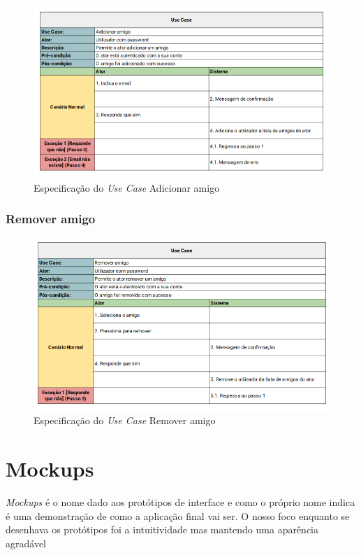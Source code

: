 \documentclass[a4paper]{report}
\begin{document}
\begin{figure}[H]
	\centering 
    \includegraphics[width=\textwidth]{images/Adicionar_Amigo.png}  
    \caption{Especificação do \emph{Use Case} Adicionar amigo}
\end{figure}


\subsection{Remover amigo}

\begin{figure}[H]
	\centering 
    \includegraphics[width=\textwidth]{images/Remover_Amigo.png}  
    \caption{Especificação do \emph{Use Case} Remover amigo}
\end{figure}


\chapter{Mockups}

\textit{Mockups} é o nome dado aos protótipos de interface e como o próprio nome
indica é uma demonstração de como a aplicação final vai ser. O nosso foco enquanto 
se desenhava os protótipos foi a intuitividade mas mantendo uma aparência agradável
\end{document}
